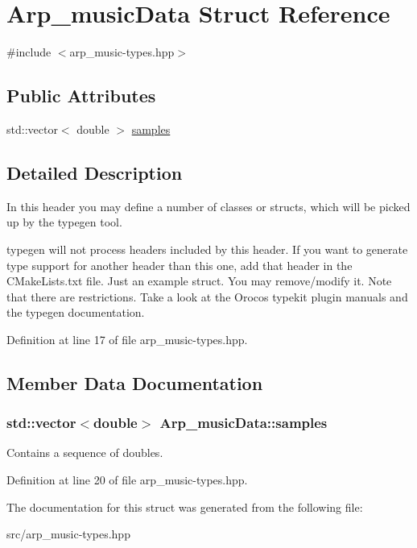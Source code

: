 \hypertarget{structArp__musicData}{
\section{Arp\_\-musicData Struct Reference}
\label{structArp__musicData}
}


{\ttfamily \#include $<$arp\_\-music-\/types.hpp$>$}

\subsection*{Public Attributes}
\begin{DoxyCompactItemize}
\item 
std::vector$<$ double $>$ \hyperlink{structArp__musicData_a6b2aef6e630f76b9a7c0d9cd01621af5}{samples}
\end{DoxyCompactItemize}


\subsection{Detailed Description}
In this header you may define a number of classes or structs, which will be picked up by the typegen tool.

typegen will not process headers included by this header. If you want to generate type support for another header than this one, add that header in the CMakeLists.txt file. Just an example struct. You may remove/modify it. Note that there are restrictions. Take a look at the Orocos typekit plugin manuals and the typegen documentation. 

Definition at line 17 of file arp\_\-music-\/types.hpp.



\subsection{Member Data Documentation}
\hypertarget{structArp__musicData_a6b2aef6e630f76b9a7c0d9cd01621af5}{
\subsubsection[{samples}]{\setlength{\rightskip}{0pt plus 5cm}std::vector$<$double$>$ {\bf Arp\_\-musicData::samples}}}
\label{structArp__musicData_a6b2aef6e630f76b9a7c0d9cd01621af5}
Contains a sequence of doubles. 

Definition at line 20 of file arp\_\-music-\/types.hpp.



The documentation for this struct was generated from the following file:\begin{DoxyCompactItemize}
\item 
src/arp\_\-music-\/types.hpp\end{DoxyCompactItemize}
